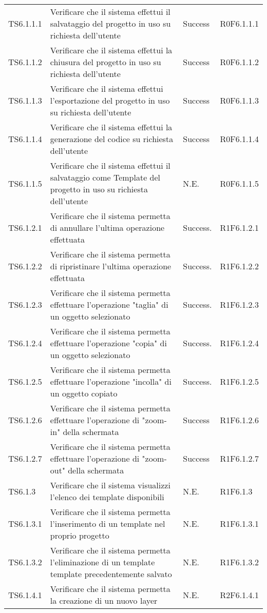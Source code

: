 \begin{longtable}{p{2.5cm}!{\VRule[1pt]}p{6cm}!{\VRule[1pt]}p{1.5cm}!{\VRule[1pt]}p{3cm}}
TS6.1.1.1 & Verificare che il sistema effettui il salvataggio del progetto in uso su richiesta dell'utente & Success & R0F6.1.1.1\\
TS6.1.1.2 & Verificare che il sistema effettui la chiusura del progetto in uso su richiesta dell'utente & Success & R0F6.1.1.2\\
TS6.1.1.3 & Verificare che il sistema effettui l'esportazione del progetto in uso su richiesta dell'utente & Success & R0F6.1.1.3\\
TS6.1.1.4 & Verificare che il sistema effettui la generazione del codice su richiesta dell'utente & Success & R0F6.1.1.4\\
TS6.1.1.5 & Verificare che il sistema effettui il salvataggio come Template del progetto in uso su richiesta dell'utente & N.E. & R0F6.1.1.5\\
TS6.1.2.1 & Verificare che il sistema permetta di annullare l'ultima operazione effettuata & Success. & R1F6.1.2.1\\
TS6.1.2.2 & Verificare che il sistema permetta di ripristinare l'ultima operazione effettuata & Success. & R1F6.1.2.2\\
TS6.1.2.3 & Verificare che il sistema permetta effettuare l'operazione "taglia" di un oggetto selezionato & Success. & R1F6.1.2.3\\
TS6.1.2.4 & Verificare che il sistema permetta effettuare l'operazione "copia" di un oggetto selezionato & Success. & R1F6.1.2.4\\
TS6.1.2.5 & Verificare che il sistema permetta effettuare l'operazione "incolla" di un oggetto copiato & Success. & R1F6.1.2.5\\
TS6.1.2.6 & Verificare che il sistema permetta effettuare l'operazione di "zoom-in" della schermata & Success & R1F6.1.2.6\\
TS6.1.2.7 & Verificare che il sistema permetta effettuare l'operazione di "zoom-out" della schermata & Success & R1F6.1.2.7\\
TS6.1.3 & Verificare che il sistema visualizzi l'elenco dei template disponibili & N.E. & R1F6.1.3 \\
TS6.1.3.1 & Verificare che il sistema permetta l'inserimento di un template nel proprio progetto& N.E. & R1F6.1.3.1 \\
TS6.1.3.2 & Verificare che il sistema permetta l'eliminazione di un template template precedentemente salvato & N.E. & R1F6.1.3.2 \\
TS6.1.4.1 & Verificare che il sistema permetta la creazione di un nuovo layer & N.E. & R2F6.1.4.1 \\

\end{longtable}
